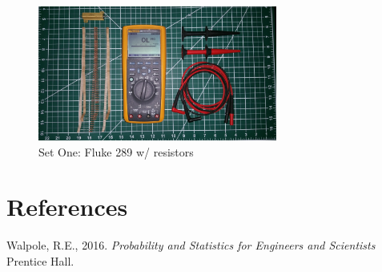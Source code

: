 \documentclass[10pt]{report}
\begin{document}
\begin{figure}[h!]
    \centering
    \includegraphics[width=0.7\textwidth]{process/dmm_resistors}
    \caption{Set One: Fluke 289 w/ resistors}
\end{figure}

\newpage
\section*{References}

Walpole, R.E., 2016. \textit{Probability and Statistics for Engineers and Scientists} Prentice Hall.
\newline
\newline
\end{document}
